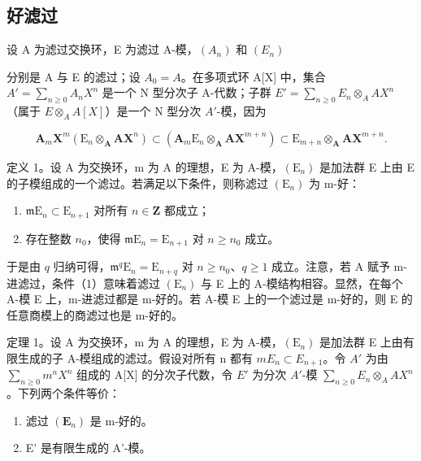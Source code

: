 \subsection{好滤过}

设 A 为滤过交换环，E 为滤过 A-模，\((A_{n})\) 和 \((E_{n})\)

分别是 A 与 E 的滤过；设 \(A_{0} = A\)。在多项式环 A{[}X{]} 中，集合 \(A' = \sum_{n \geqslant 0} A_{n} X^{n}\) 是一个 N 型分次子 A-代数；子群 \(E' = \sum_{n \geqslant 0} E_{n} \otimes_{A} A X^{n}\)（属于 \(E \otimes_{A} A[X]\)）是一个 N 型分次 \(A'\)-模，因为

\[
\mathbf {A} _ {m} \mathbf {X} ^ {m} (\mathrm{E} _ {n} \otimes_ {\mathbf {A}} \mathbf {A X} ^ {n}) \subset (\mathbf {A} _ {m} \mathrm{E} _ {n} \otimes_ {\mathbf {A}} \mathbf {A X} ^ {m + n}) \subset \mathrm{E} _ {m + n} \otimes_ {\mathbf {A}} \mathbf {A X} ^ {m + n}.
\]

定义 1。设 A 为交换环，m 为 A 的理想，E 为 A-模，\((\mathrm{E}_{n})\) 是加法群 E 上由 E 的子模组成的一个滤过。若满足以下条件，则称滤过 \((\mathrm{E}_{n})\) 为 m-好：

\begin{enumerate}
\def\labelenumi{(\arabic{enumi})}
\item
  \(\mathfrak{m}\mathrm{E}_n\subset \mathrm{E}_{n + 1}\) 对所有 \(n\in \mathbf{Z}\) 都成立；
\item
  存在整数 \(n_0\)，使得 \(\mathfrak{m}\mathrm{E}_n = \mathrm{E}_{n+1}\) 对 \(n \geqslant n_0\) 成立。
\end{enumerate}

于是由 \(q\) 归纳可得，\(\mathfrak{m}^q\mathrm{E}_n = \mathrm{E}_{n + q}\) 对 \(n \geqslant n_0\)、\(q \geqslant 1\) 成立。注意，若 A 赋予 m-进滤过，条件（1）意味着滤过 \((\mathrm{E}_n)\) 与 E 上的 A-模结构相容。显然，在每个 A-模 E 上，m-进滤过都是 m-好的。若 A-模 E 上的一个滤过是 m-好的，则 E 的任意商模上的商滤过也是 m-好的。

定理 1。设 A 为交换环，m 为 A 的理想，E 为 A-模，\((\mathrm{E}_{n})\) 是加法群 E 上由有限生成的子 A-模组成的滤过。假设对所有 n 都有 \(mE_{n} \subset E_{n+1}\)。令 \(A'\) 为由 \(\sum_{n \geqslant 0} m^{n} X^{n}\) 组成的 A{[}X{]} 的分次子代数，令 \(E'\) 为分次 \(A'\)-模 \(\sum_{n \geqslant 0} E_{n} \otimes_{A} AX^{n}\)。下列两个条件等价：

\begin{enumerate}
\def\labelenumi{(\alph{enumi})}
\item
  滤过 \((\mathbf{E}_n)\) 是 m-好的。
\item
  E' 是有限生成的 A'-模。
\end{enumerate}

